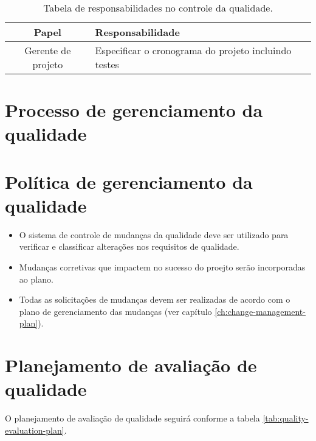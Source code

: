 \begin{table}[H]
	\begin{tabularx}{\textwidth}{| c | X |}
		\hline
		\textbf{Papel}     & \textbf{Responsabilidade}                            \\
		\hline
		Gerente de projeto & Especificar o cronograma do projeto incluindo testes \\
		\hline
	\end{tabularx}
	\centering
	\caption{Tabela de responsabilidades no controle da qualidade.}
\end{table}

\section{Processo de gerenciamento da qualidade}


\section{Política de gerenciamento da qualidade}

\begin{itemize}
	\item O sistema de controle de mudanças da qualidade deve ser utilizado para verificar e classificar alterações nos requisitos de qualidade.
	\item Mudanças corretivas que impactem no sucesso do proejto serão incorporadas ao plano.
	\item Todas as solicitações de mudanças devem ser realizadas de acordo com o plano de gerenciamento das mudanças (ver capítulo \ref{ch:change-management-plan}).
\end{itemize}

\section{Planejamento de avaliação de qualidade}

O planejamento de avaliação de qualidade seguirá conforme a tabela \ref{tab:quality-evaluation-plan}.

